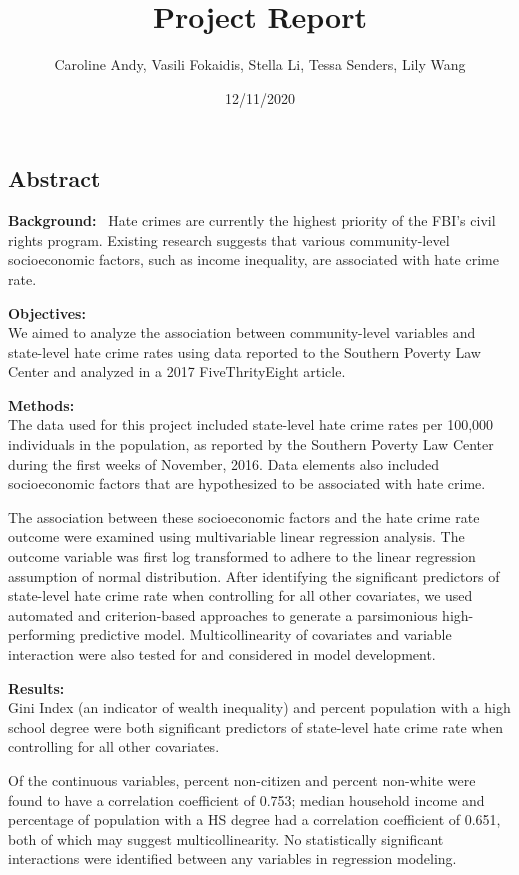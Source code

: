 \documentclass[
]{article}
\title{Project Report}
\author{Caroline Andy, Vasili Fokaidis, Stella Li, Tessa Senders, Lily Wang}
\date{12/11/2020}
\begin{document}
\maketitle

\hypertarget{abstract}{%
\subsection{Abstract}\label{abstract}}

\textbf{Background:}~ Hate crimes are currently the highest priority of
the FBI's civil rights program. Existing research suggests that various
community-level socioeconomic factors, such as income inequality, are
associated with hate crime rate.

\textbf{Objectives:}\\
We aimed to analyze the association between community-level variables
and state-level hate crime rates using data reported to the Southern
Poverty Law Center and analyzed in a 2017 FiveThrityEight article.

\textbf{Methods:}\\
The data used for this project included state-level hate crime rates per
100,000 individuals in the population, as reported by the Southern
Poverty Law Center during the first weeks of November, 2016. Data
elements also included socioeconomic factors that are hypothesized to be
associated with hate crime.

The association between these socioeconomic factors and the hate crime
rate outcome were examined using multivariable linear regression
analysis. The outcome variable was first log transformed to adhere to
the linear regression assumption of normal distribution. After
identifying the significant predictors of state-level hate crime rate
when controlling for all other covariates, we used automated and
criterion-based approaches to generate a parsimonious high-performing
predictive model. Multicollinearity of covariates and variable
interaction were also tested for and considered in model development.

\textbf{Results:}\\
Gini Index (an indicator of wealth inequality) and percent population
with a high school degree were both significant predictors of
state-level hate crime rate when controlling for all other covariates.

Of the continuous variables, percent non-citizen and percent non-white
were found to have a correlation coefficient of 0.753; median household
income and percentage of population with a HS degree had a correlation
coefficient of 0.651, both of which may suggest multicollinearity. No
statistically significant interactions were identified between any
variables in regression modeling.
\end{document}
